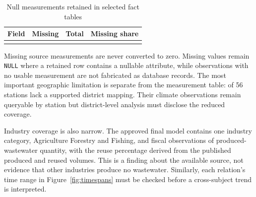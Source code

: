 \begin{table}[H]
\centering
\caption{Null measurements retained in selected fact tables}
\label{tab:missing-measurements}
\begin{tabular}{L{0.38\textwidth}r r r}
\toprule
Field & Missing & Total & Missing share \\
\midrule
{}
\bottomrule
\end{tabular}
\end{table}

Missing source measurements are never converted to zero. Missing values remain
\texttt{NULL} where a retained row contains a nullable attribute, while
observations with no usable measurement are not fabricated as database records.
The most important geographic limitation is separate from the measurement table:
\mUnmappedStations{} of 56 stations lack a supported district mapping.
Their climate observations remain queryable by station but district-level
analysis must disclose the reduced coverage.

Industry coverage is also narrow. The approved final model contains one
industry category, Agriculture Forestry and Fishing, and \mIndustryRows{}
fiscal observations of produced-wastewater quantity, with the reuse percentage
derived from the published produced and reused volumes. This is a finding
about the available source, not evidence that other industries produce no
wastewater. Similarly, each relation's time range in
Figure~\ref{fig:timespans} must be checked before a cross-subject trend is
interpreted.
